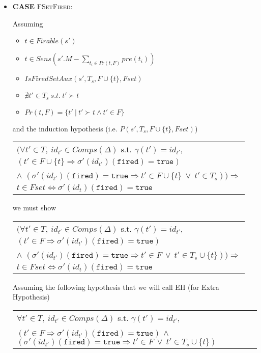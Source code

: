 \documentclass[dvipsnames,12pt]{article}
\begin{document}
\begin{niproof}
\begin{itemize}
  \item \textbf{CASE} \textsc{FSetFired}:

    Assuming
    \begin{itemize}
    \item $t\in{}Firable(s')$
    \item $t\in{}Sens(s'.M-\sum\limits_{t_i\in{}Pr(t,F)}pre(t_i))$
    \item $IsFiredSetAux(s',T_s,F\cup\{t\},Fset)$
    \item $\nexists{}t'\in{}T_s~s.t.~t'\succ{}t$
    \item $Pr(t,F)=\{t'~\vert~t'\succ{}t\land{}t'\in{}F\}$
    \end{itemize}
    and the induction hypothesis (i.e. $P(s',T_s,F\cup\{t\},Fset)$)
    \begin{ih}
      \begin{tabular}{l}
        $\big(\forall{}t'\in{}T,~id_{t'}\in{}Comps(\Delta)$
        s.t. $\gamma(t')=id_{t'}$,\\
        $(t'\in{}F\cup\{t\}\Rightarrow\sigma'(id_{t'})(\texttt{fired})=\mathtt{true})$\\
        $\land$
        $(\sigma'(id_{t'})(\texttt{fired})=\mathtt{true}\Rightarrow{}t'\in{}F\cup\{t\}~\lor~{}t'\in{}T_s)\big)\Rightarrow$ \\
        $t\in{}Fset\Leftrightarrow\sigma'(id_t)(\texttt{fired})=\mathtt{true}$
      \end{tabular}
    \end{ih}

    we must show

    \begin{frameb}
      \begin{tabular}{l}
        $\big(\forall{}t'\in{}T,~id_{t'}\in{}Comps(\Delta)$
        s.t. $\gamma(t')=id_{t'}$,\\
        $(t'\in{}F\Rightarrow\sigma'(id_{t'})(\texttt{fired})=\mathtt{true})$\\
        $\land$
        $(\sigma'(id_{t'})(\texttt{fired})=\mathtt{true}\Rightarrow{}t'\in{}F~\lor~{}t'\in{}T_s\cup\{t\})\big)\Rightarrow$ \\
        $t\in{}Fset\Leftrightarrow\sigma'(id_t)(\texttt{fired})=\mathtt{true}$
      \end{tabular}
    \end{frameb}

    Assuming the following hypothesis that we will call EH (for Extra
    Hypothesis)

    \begin{center}
      \begin{tabular}{l}
        $\forall{}t'\in{}T,~id_{t'}\in{}Comps(\Delta)$
        s.t. $\gamma(t')=id_{t'}$,\\
        $(t'\in{}F\Rightarrow\sigma'(id_{t'})(\texttt{fired})=\mathtt{true})$
        $\land$
        $(\sigma'(id_{t'})(\texttt{fired})=\mathtt{true}\Rightarrow{}t'\in{}F~\lor~{}t'\in{}T_s\cup\{t\})$ \\
      \end{tabular}
    \end{center}


\end{itemize}
\end{niproof}
\end{document}
